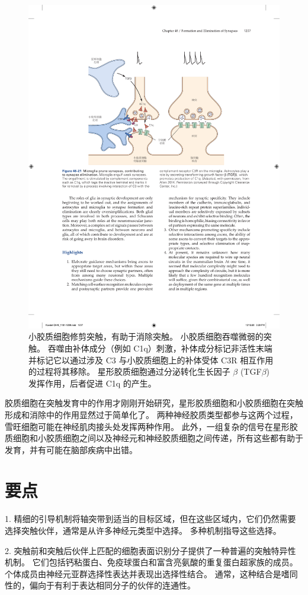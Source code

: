\begin{figure}[htbp]
	\centering
	\includegraphics[width=0.7\linewidth]{chap48/fig_48_21}
	\caption{小胶质细胞修剪突触，有助于消除突触。
		小胶质细胞吞噬微弱的突触。
		吞噬由补体成分（例如 C1q）刺激，补体成分标记非活性末端并标记它以通过涉及 C3 与小胶质细胞上的补体受体 C3R 相互作用的过程将其移除。
		星形胶质细胞通过分泌转化生长因子 $ \beta $ (TGF$ \beta $) 发挥作用，后者促进 C1q 的产生\cite{allen2014astrocyte}。}
	\label{fig:48_21}
\end{figure}


胶质细胞在突触发育中的作用才刚刚开始研究，星形胶质细胞和小胶质细胞在突触形成和消除中的作用显然过于简单化了。
两种神经胶质类型都参与这两个过程，雪旺细胞可能在神经肌肉接头处发挥两种作用。
此外，一组复杂的信号在星形胶质细胞和小胶质细胞之间以及神经元和神经胶质细胞之间传递，所有这些都有助于发育，并有可能在脑部疾病中出错。



\section{要点}

1. 精细的引导机制将轴突带到适当的目标区域，但在这些区域内，它们仍然需要选择突触伙伴，通常是从许多神经元类型中选择。
多种机制指导这些选择。


2. 突触前和突触后伙伴上匹配的细胞表面识别分子提供了一种普遍的突触特异性机制。
它们包括钙粘蛋白、免疫球蛋白和富含亮氨酸的重复蛋白超家族的成员。
个体成员由神经元亚群选择性表达并表现出选择性结合。
通常，这种结合是嗜同性的，偏向于有利于表达相同分子的伙伴的连通性。


